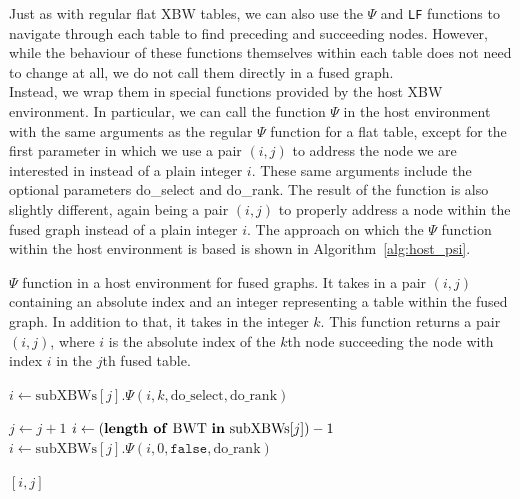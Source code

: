 \documentclass[a4paper,12pt,twoside,BCOR=10mm]{scrbook}
\begin{document}
Just as with regular flat XBW tables, we can also use the $ \Psi $ and \texttt{LF} functions
to navigate through each table to find preceding and succeeding nodes.
However, while the behaviour of these functions themselves within each table does not need to change
at all, we do not call them directly in a fused graph. \\
Instead, we wrap them in special functions provided by the host XBW environment.
In particular, we can call the function $\Psi$ in the host environment with the same arguments
as the regular $ \Psi $ function for a flat table, except for the first parameter
in which we use a pair $ (i, j) $ to address the node
we are interested in instead of a plain integer $ i $.
These same arguments include the optional parameters do\_select and do\_rank.
The result of the function is also slightly different, again being a pair $ (i, j) $ to
properly address a node within the fused graph instead of a plain integer $ i $.
The approach on which the $ \Psi $ function within the host environment is based
is shown in Algorithm~\ref{alg:host_psi}. \\
\begin{algorithm}
\caption[$\Psi$ function in a host environment for fused graphs]{$\Psi$ function in a host environment for fused graphs. It takes in a pair $ (i, j) $ containing an absolute index and an integer representing a table within the fused graph. In addition to that, it takes in the integer $ k $. This function returns a pair $ (i, j) $, where $ i $ is the absolute index of the $ k $th node succeeding the node with index $ i $ in the $ j $th fused table.}
\label{alg:host_psi}
\begin{algorithmic}[1]

\State $ i \gets \textrm{subXBWs}[ j ].{\Psi}( i, k, \textrm{do\_select}, \textrm{do\_rank} ) $

\State \phantom{nl}

	\State $ j \gets j + 1 $
	\State $ i \gets ( \textrm{\textbf{length of} BWT \textbf{in} subXBWs}[ j ] ) - 1 $
	\State $ i \gets \textrm{subXBWs}[ j ].{\Psi}( i, 0, \texttt{false}, \textrm{do\_rank} ) $
\EndIf

\State \phantom{nl}

\State \Return $ [ i, j ] $

\end{algorithmic}
\end{algorithm}
\end{document}
